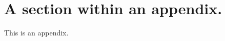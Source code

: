 \documentclass[12pt]{report}
\begin{document}
\section{A section within an appendix.}
This is an appendix.




\singlespacing

%
%
%





%

%
\end{document}
